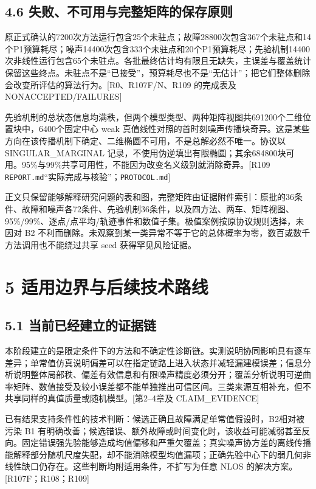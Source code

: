 \documentclass[12pt,a4paper]{article}
\begin{document}
\subsection{4.6
失败、不可用与完整矩阵的保存原则}\label{ux5931ux8d25ux4e0dux53efux7528ux4e0eux5b8cux6574ux77e9ux9635ux7684ux4fddux5b58ux539fux5219}

原正式确认的7200次方法运行包含25个未驻点；故障28800次包含367个未驻点和14个P1预算耗尽；噪声14400次包含333个未驻点和20个P1预算耗尽；先验机制14400次非线性运行包含65个未驻点。各批最终估计均有限且无缺失，主误差与覆盖统计保留这些终点。未驻点不是``已接受''，预算耗尽也不是``无估计''；把它们整体删除会改变所评估的算法行为。{[}R0、R107F/N、R109
的完成表及 NONACCEPTED/FAILURES{]}

先验机制的总状态信息均满秩，但两个模型类型、两种矩阵视图共691200个二维位置块中，6400个固定中心
weak
真值线性对照的首时刻噪声传播块奇异。这是某些方向在该传播机制下确定、二维椭圆不可用，不是总解必然不唯一。协议以
SINGULAR\_MARGINAL
记录，不使用伪逆填出有限椭圆；其余684800块可用。95\%与99\%共享可用性，不能因为改变名义级别就消除奇异。{[}R109
\texttt{REPORT.md}``实际完成与核验''；\texttt{PROTOCOL.md}{]}

正文只保留能够解释研究问题的表和图，完整矩阵由证据附件索引：原批的36条件、故障和噪声各72条件、先验机制36条件，以及四方法、两车、矩阵视图、95\%/99\%、逐点/点平均/轨迹事件和数值子集。极值案例按原协议规则选择，未因对
B2
不利而删除。未观察到某一类异常不等于它的总体概率为零，数百或数千方法调用也不能绕过共享
seed 获得罕见风险证据。

\section{5
适用边界与后续技术路线}\label{ux9002ux7528ux8fb9ux754cux4e0eux540eux7eedux6280ux672fux8defux7ebf}

\subsection{5.1
当前已经建立的证据链}\label{ux5f53ux524dux5df2ux7ecfux5efaux7acbux7684ux8bc1ux636eux94fe}

本阶段建立的是限定条件下的方法和不确定性诊断链。实测说明协同影响具有逐车差异；单常值仿真说明偏差可以在指定链路上进入状态并减轻漏建模误差；信息分析说明整体局部秩、偏差有效信息和有限噪声精度必须分开；覆盖分析说明可逆曲率矩阵、数值接受及较小误差都不能单独推出可信区间。三类来源互相补充，但不共享同样的真值质量或随机模型。{[}第2--4章及
CLAIM\_EVIDENCE{]}

已有结果支持条件性的技术判断：候选正确且故障满足单常值假设时，B2相对被污染
B1
有明确改善；候选错误、额外故障或时间变化时，该收益可能减弱甚至反向。固定错误强先验能够造成均值偏移和严重欠覆盖；真实噪声协方差的离线传播能解释部分随机尺度失配，却不能消除模型均值漏项；正确先验中心下的弱几何非线性缺口仍存在。这些判断均附适用条件，不扩写为任意
NLOS 的解决方案。{[}R107F；R108；R109{]}
\end{document}
